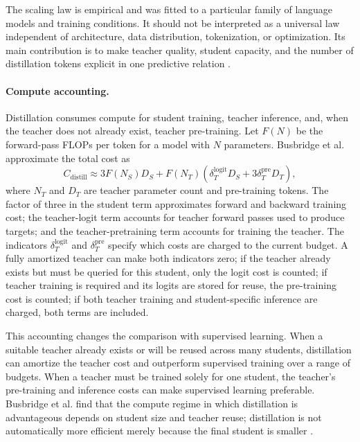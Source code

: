 The scaling law is empirical and was fitted to a particular family of
language models and training conditions.  It should not be interpreted as a
universal law independent of architecture, data distribution, tokenization,
or optimization.  Its main contribution is to make teacher quality,
student capacity, and the number of distillation tokens explicit in one
predictive relation \parencite{Busbridge2025DistillationScalingLaws}.

\paragraph{Compute accounting.}
Distillation consumes compute for student training, teacher inference, and,
when the teacher does not already exist, teacher pre-training.  Let \(F(N)\)
be the forward-pass FLOPs per token for a model with \(N\) parameters.
Busbridge et al. approximate the total cost as
\begin{equation}
    C_{\mathrm{distill}}
    \approx 3F(N_S)D_S
    +F(N_T)\left(
       \delta_{T}^{\mathrm{logit}}D_S
       +3\delta_{T}^{\mathrm{pre}}D_T
    \right),
    \label{eq:distillation-compute-cost}
\end{equation}
where \(N_T\) and \(D_T\) are teacher parameter count and pre-training
tokens.  The factor of three in the student term approximates forward and
backward training cost; the teacher-logit term accounts for teacher forward
passes used to produce targets; and the teacher-pretraining term accounts
for training the teacher.  The indicators
\(\delta_T^{\mathrm{logit}}\) and
\(\delta_T^{\mathrm{pre}}\) specify which costs are charged to the
current budget.  A fully amortized teacher can make both indicators zero;
if the teacher already exists but must be queried for this student, only
the logit cost is counted; if teacher training is required and its logits
are stored for reuse, the pre-training cost is counted; if both teacher
training and student-specific inference are charged, both terms are
included.

This accounting changes the comparison with supervised learning.  When a
suitable teacher already exists or will be reused across many students,
distillation can amortize the teacher cost and outperform supervised
training over a range of budgets.  When a teacher must be trained solely
for one student, the teacher's pre-training and inference costs can make
supervised learning preferable.  Busbridge et al. find that the compute
regime in which distillation is advantageous depends on student size and
teacher reuse; distillation is not automatically more efficient merely
because the final student is smaller
\parencite{Busbridge2025DistillationScalingLaws}.

